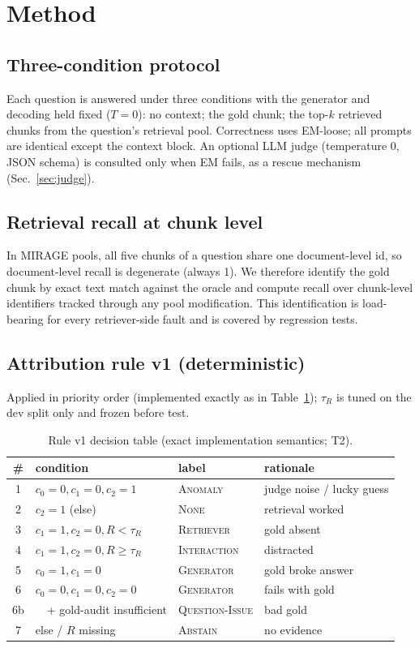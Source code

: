 \documentclass[conference]{IEEEtran}
\begin{document}
\section{Method}
\subsection{Three-condition protocol}
Each question is answered under three conditions with the generator and
decoding held fixed ($T=0$): no context; the gold chunk; the top-$k$
retrieved chunks from the question's retrieval pool. Correctness uses
EM-loose; all prompts are identical except the context block. An optional
LLM judge (temperature 0, JSON schema) is consulted only when EM fails, as a
rescue mechanism (Sec.~\ref{sec:judge}).

\subsection{Retrieval recall at chunk level}
In MIRAGE pools, all five chunks of a question share one document-level id,
so document-level recall is degenerate (always 1). We therefore identify the
gold chunk by exact text match against the oracle and compute recall over
chunk-level identifiers tracked through any pool modification. This
identification is load-bearing for every retriever-side fault and is covered
by regression tests.

\subsection{Attribution rule v1 (deterministic)}
Applied in priority order (implemented exactly as in
Table~\ref{tab:rule}); $\tau_R$ is tuned on the dev split only and frozen
before test.

\begin{table}[t]
\caption{Rule v1 decision table (exact implementation semantics; T2).}
\label{tab:rule}
\footnotesize
\setlength{\tabcolsep}{2pt}
\begin{tabular}{clll}
\toprule
\# & condition & label & rationale \\
\midrule
1 & $c_0{=}0,c_1{=}0,c_2{=}1$ & \textsc{Anomaly} & judge noise / lucky guess \\
2 & $c_2{=}1$ (else) & \textsc{None} & retrieval worked \\
3 & $c_1{=}1,c_2{=}0,R{<}\tau_R$ & \textsc{Retriever} & gold absent \\
4 & $c_1{=}1,c_2{=}0,R{\ge}\tau_R$ & \textsc{Interaction} & distracted \\
5 & $c_0{=}1,c_1{=}0$ & \textsc{Generator} & gold broke answer \\
6 & $c_0{=}0,c_1{=}0,c_2{=}0$ & \textsc{Generator} & fails with gold \\
6b & \ \ + gold-audit insufficient & \textsc{Question-Issue} & bad gold \\
7 & else / $R$ missing & \textsc{Abstain} & no evidence \\
\bottomrule
\end{tabular}
\end{table}
\end{document}
